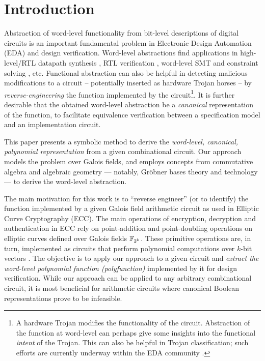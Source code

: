 \section{Introduction}

Abstraction of word-level functionality from bit-level descriptions of
digital circuits is an important fundamental problem in Electronic
Design Automation (EDA) and design verification. Word-level abstractions
find applications in high-level/RTL datapath synthesis
\cite{demicheli:tcad_03}, RTL verification \cite{WLS} %
\cite{lpsat}, word-level SMT and constraint solving \cite{ms:research}
\cite{boolector}, %
etc. Functional abstraction can
also be helpful in detecting malicious modifications to a circuit --
potentially inserted as hardware Trojan horses -- by
{\it reverse-engineering} the function implemented by the circuit\footnote{A
hardware Trojan modifies the functionality of the 
circuit. Abstraction of the function at word-level can perhaps give
some insights into the functional {\it intent} of the Trojan. This can
also be helpful in Trojan classification; such efforts are
currently underway within the EDA community \cite{Bhunia:Trojan}.}. 
It is further desirable that the obtained word-level abstraction be a
{\it canonical} representation of the function, to facilitate
equivalence verification between a specification model and an
implementation circuit. 

This paper presents a symbolic method to derive the {\it word-level,
  canonical, polynomial representation} from a given combinational
circuit. Our approach models the problem over Galois fields, and employs
concepts from commutative algebra and algebraic geometry ---
notably, Gr\"obner bases \cite{ideals:book} theory and
technology --- to derive the word-level abstraction.

The main motivation for this work is to ``reverse engineer'' (or
to identify) the function implemented by a given Galois field
arithmetic circuit as used in Elliptic Curve Cryptography (ECC). The
main operations of encryption, decryption and authentication in ECC
rely on point-addition and point-doubling operations on elliptic
curves defined over Galois fields ${\mathbb{F}}_{2^k}$. These primitive operations
are, in turn, implemented as circuits that perform polynomial
computations over $k$-bit vectors \cite{eccld}. 
The objective is to apply our approach to a given circuit and
{\it extract  the word-level polynomial function (polyfunction)}
implemented by it for design verification. While our approach can be
applied to any arbitrary combinational circuit, it is most beneficial
for arithmetic circuits where canonical Boolean representations prove
to be infeasible. 


